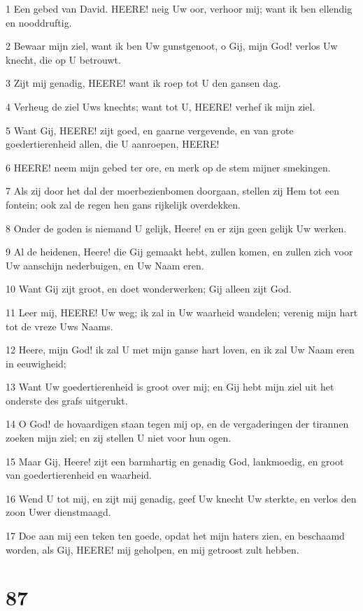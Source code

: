 \par 1 Een gebed van David. HEERE! neig Uw oor, verhoor mij; want ik ben ellendig en nooddruftig.
\par 2 Bewaar mijn ziel, want ik ben Uw gunstgenoot, o Gij, mijn God! verlos Uw knecht, die op U betrouwt.
\par 3 Zijt mij genadig, HEERE! want ik roep tot U den gansen dag.
\par 4 Verheug de ziel Uws knechts; want tot U, HEERE! verhef ik mijn ziel.
\par 5 Want Gij, HEERE! zijt goed, en gaarne vergevende, en van grote goedertierenheid allen, die U aanroepen, HEERE!
\par 6 HEERE! neem mijn gebed ter ore, en merk op de stem mijner smekingen.
\par 7 Als zij door het dal der moerbezienbomen doorgaan, stellen zij Hem tot een fontein; ook zal de regen hen gans rijkelijk overdekken.
\par 8 Onder de goden is niemand U gelijk, Heere! en er zijn geen gelijk Uw werken.
\par 9 Al de heidenen, Heere! die Gij gemaakt hebt, zullen komen, en zullen zich voor Uw aanschijn nederbuigen, en Uw Naam eren.
\par 10 Want Gij zijt groot, en doet wonderwerken; Gij alleen zijt God.
\par 11 Leer mij, HEERE! Uw weg; ik zal in Uw waarheid wandelen; verenig mijn hart tot de vreze Uws Naams.
\par 12 Heere, mijn God! ik zal U met mijn ganse hart loven, en ik zal Uw Naam eren in eeuwigheid;
\par 13 Want Uw goedertierenheid is groot over mij; en Gij hebt mijn ziel uit het onderste des grafs uitgerukt.
\par 14 O God! de hovaardigen staan tegen mij op, en de vergaderingen der tirannen zoeken mijn ziel; en zij stellen U niet voor hun ogen.
\par 15 Maar Gij, Heere! zijt een barmhartig en genadig God, lankmoedig, en groot van goedertierenheid en waarheid.
\par 16 Wend U tot mij, en zijt mij genadig, geef Uw knecht Uw sterkte, en verlos den zoon Uwer dienstmaagd.
\par 17 Doe aan mij een teken ten goede, opdat het mijn haters zien, en beschaamd worden, als Gij, HEERE! mij geholpen, en mij getroost zult hebben.

\chapter{87}

